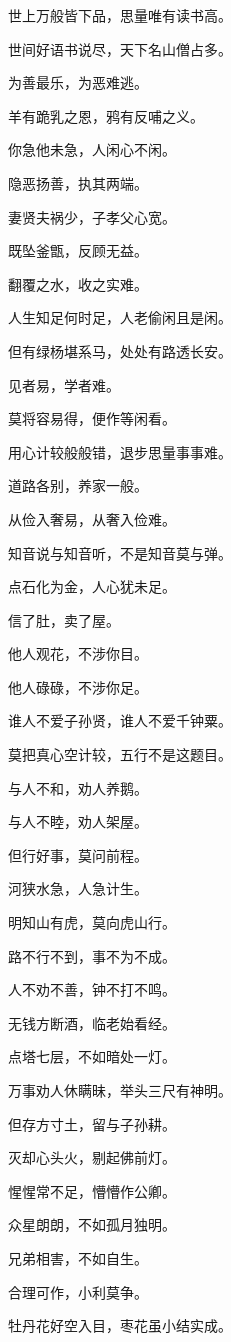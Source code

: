 \documentclass[12pt,oneside]{book}
\begin{document}
世上万般皆下品，思量唯有读书高。

世间好语书说尽，天下名山僧占多。

为善最乐，为恶难逃。

羊有跪乳之恩，鸦有反哺之义。

你急他未急，人闲心不闲。

隐恶扬善，执其两端。

妻贤夫祸少，子孝父心宽。

既坠釜甑，反顾无益。

翻覆之水，收之实难。

人生知足何时足，人老偷闲且是闲。

但有绿杨堪系马，处处有路透长安。

见者易，学者难。

莫将容易得，便作等闲看。

用心计较般般错，退步思量事事难。

道路各别，养家一般。

从俭入奢易，从奢入俭难。

知音说与知音听，不是知音莫与弹。

点石化为金，人心犹未足。

信了肚，卖了屋。

他人观花，不涉你目。

他人碌碌，不涉你足。

谁人不爱子孙贤，谁人不爱千钟粟。

莫把真心空计较，五行不是这题目。

与人不和，劝人养鹅。

与人不睦，劝人架屋。

但行好事，莫问前程。

河狭水急，人急计生。

明知山有虎，莫向虎山行。

路不行不到，事不为不成。

人不劝不善，钟不打不鸣。

无钱方断酒，临老始看经。

点塔七层，不如暗处一灯。

万事劝人休瞒昧，举头三尺有神明。

但存方寸土，留与子孙耕。

灭却心头火，剔起佛前灯。

惺惺常不足，懵懵作公卿。

众星朗朗，不如孤月独明。

兄弟相害，不如自生。

合理可作，小利莫争。

牡丹花好空入目，枣花虽小结实成。
\end{document}
